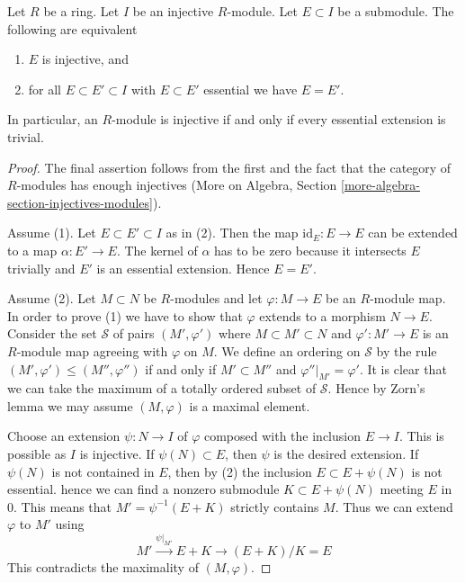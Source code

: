 \begin{lemma}
\label{lemma-essential-extensions-in-injective}
Let $R$ be a ring. Let $I$ be an injective $R$-module. Let $E \subset I$
be a submodule. The following are equivalent
\begin{enumerate}
\item $E$ is injective, and
\item for all $E \subset E' \subset I$ with $E \subset E'$ essential
we have $E = E'$.
\end{enumerate}
In particular, an $R$-module is injective if and only if every essential
extension is trivial.
\end{lemma}

\begin{proof}
The final assertion follows from the first and the fact that the
category of $R$-modules has enough injectives
(More on Algebra, Section \ref{more-algebra-section-injectives-modules}).

\medskip\noindent
Assume (1). Let $E \subset E' \subset I$ as in (2).
Then the map $\text{id}_E : E \to E$ can be extended
to a map $\alpha : E' \to E$. The kernel of $\alpha$ has to be
zero because it intersects $E$ trivially and $E'$ is an essential
extension. Hence $E = E'$.

\medskip\noindent
Assume (2). Let $M \subset N$ be $R$-modules and let $\varphi : M \to E$
be an $R$-module map. In order to prove (1) we have to show that
$\varphi$ extends to a morphism $N \to E$. Consider the set $\mathcal{S}$
of pairs
$(M', \varphi')$ where $M \subset M' \subset N$ and $\varphi' : M' \to E$
is an $R$-module map agreeing with $\varphi$ on $M$. We define an ordering
on $\mathcal{S}$ by the rule $(M', \varphi') \leq (M'', \varphi'')$
if and only if $M' \subset M''$ and $\varphi''|_{M'} = \varphi'$.
It is clear that we can take the maximum of a totally ordered subset
of $\mathcal{S}$. Hence by Zorn's lemma we may assume $(M, \varphi)$
is a maximal element.

\medskip\noindent
Choose an extension $\psi : N \to I$ of $\varphi$ composed
with the inclusion $E \to I$. This is possible as $I$ is injective.
If $\psi(N) \subset E$, then $\psi$ is the desired extension.
If $\psi(N)$ is not contained in $E$, then by (2) the inclusion
$E \subset E + \psi(N)$ is not essential. hence
we can find a nonzero submodule $K \subset E + \psi(N)$ meeting $E$ in $0$.
This means that $M' = \psi^{-1}(E + K)$ strictly contains $M$.
Thus we can extend $\varphi$ to $M'$ using
$$
M' \xrightarrow{\psi|_{M'}} E + K \to (E + K)/K = E
$$
This contradicts the maximality of $(M, \varphi)$.
\end{proof}

